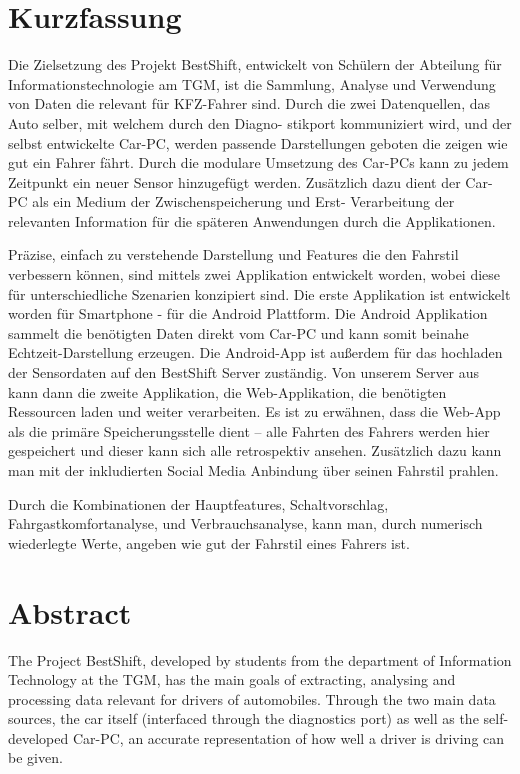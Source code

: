 \section*{Kurzfassung} 

Die Zielsetzung des Projekt BestShift, entwickelt von Schülern der Abteilung für Informationstechnologie am TGM, ist die Sammlung, Analyse und Verwendung von Daten die relevant für KFZ-Fahrer sind. Durch die zwei Datenquellen, das Auto selber, mit welchem durch den Diagno- stikport kommuniziert wird, und der selbst entwickelte Car-PC, werden passende Darstellungen geboten die zeigen wie gut ein Fahrer fährt. 
Durch die modulare Umsetzung des Car-PCs kann zu jedem Zeitpunkt ein neuer Sensor hinzugefügt werden. Zusätzlich dazu dient der Car-PC als ein Medium der Zwischenspeicherung und Erst- Verarbeitung der relevanten Information für die späteren Anwendungen durch die Applikationen. 

Präzise, einfach zu verstehende Darstellung und Features die den Fahrstil verbessern können, sind mittels zwei Applikation entwickelt worden, wobei diese für unterschiedliche Szenarien konzipiert sind. Die erste Applikation ist entwickelt worden für Smartphone - für die Android Plattform. Die Android Applikation sammelt die benötigten Daten direkt vom Car-PC und kann somit beinahe Echtzeit-Darstellung erzeugen. Die Android-App ist außerdem für das hochladen der Sensordaten auf den BestShift Server zuständig. Von unserem Server aus kann dann die zweite Applikation, die Web-Applikation, die benötigten Ressourcen laden und weiter verarbeiten. Es ist zu erwähnen, dass die Web-App als die primäre Speicherungsstelle dient – alle Fahrten des Fahrers werden hier gespeichert und dieser kann sich alle retrospektiv ansehen. Zusätzlich dazu kann man mit der inkludierten Social Media Anbindung über seinen Fahrstil prahlen. 

Durch die Kombinationen der Hauptfeatures, Schaltvorschlag, Fahrgastkomfortanalyse, und Verbrauchsanalyse, kann man, durch numerisch wiederlegte Werte, angeben wie gut der Fahrstil eines Fahrers ist.

\section*{Abstract} 

The Project BestShift, developed by students from the department of Information Technology at the TGM, has the main goals of extracting, analysing and processing data relevant for drivers of automobiles. Through the two main data sources, the car itself (interfaced through the diagnostics port) as well as the self-developed Car-PC, an accurate representation of how well a driver is driving can be given.

